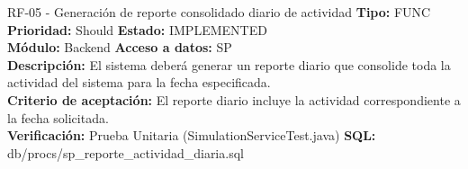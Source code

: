 \documentclass[11pt,a4paper]{article}
\begin{document}
\begin{requisito}{RF-05 - Generación de reporte consolidado diario de actividad}
    \textbf{Tipo:} FUNC \quad \textbf{Prioridad:} Should \quad \textbf{Estado:} IMPLEMENTED \\[0.2cm]
    \textbf{Módulo:} Backend \quad \textbf{Acceso a datos:} SP \\[0.2cm]
    \textbf{Descripción:} El sistema deberá generar un reporte diario que consolide toda la actividad del sistema para la fecha especificada. \\[0.2cm]
    \textbf{Criterio de aceptación:} El reporte diario incluye la actividad correspondiente a la fecha solicitada. \\[0.2cm]
    \textbf{Verificación:} Prueba Unitaria (SimulationServiceTest.java) \quad \textbf{SQL:} db/procs/sp\_reporte\_actividad\_diaria.sql
\end{requisito}
\end{document}
